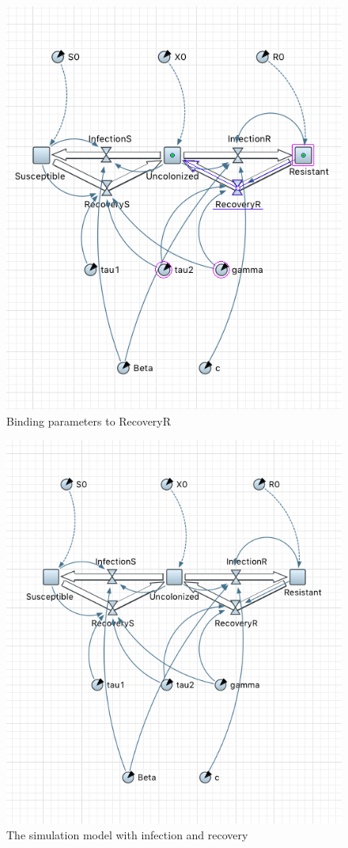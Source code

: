 \begin{figure}[H]
  \centering
  \includegraphics[height=0.6\textwidth]{img/screens/recovery/recovery9}
  \caption{Binding parameters to RecoveryR}
\end{figure}

\begin{figure}[H]
  \centering
  \includegraphics[height=0.6\textwidth]{img/screens/recovery/recovery11}
  \caption{The simulation model with infection and recovery}
\end{figure}